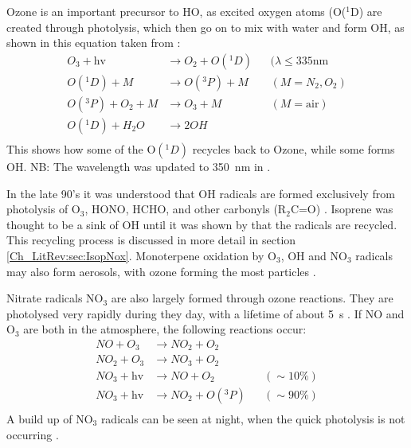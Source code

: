     Ozone is an important precursor to HO, as excited oxygen atoms (O(${}^1$D) are created through photolysis, which then go on to mix with water and form OH, as shown in this equation taken from \citet{Atkinson2000}:
    \begin{align*}
      O_3 + \text{hv}         & \to  O_2 + O({}^1D)   && (\lambda \le 335 \text{nm} \\%
      O({}^1D) + M            & \to  O({}^3P) + M     && (M=N_2, O_2)               \\%
      O({}^3P) + O_2 + M      & \to  O_3 + M          && (M=\text{air})             \\%
      O({}^1D) + H_2O         & \to  2OH              &&                            \\%
    \end{align*}
    This shows how some of the O$({}^1D)$ recycles back to Ozone, while some forms OH.
    NB: The wavelength was updated to 350~nm in \citet{AtkinsonArey2003}.
    
    In the late 90's it was understood that OH radicals are formed exclusively from photolysis of O$_3$, HONO, HCHO, and other carbonyls (R$_2$C=O) \citet{Atkinson2000}.
    Isoprene was thought to be a sink of OH until it was shown by \cite{Paulot2009b} that the radicals are recycled.
    This recycling process is discussed in more detail in section \ref{Ch_LitRev:sec:IsopNox}.
    Monoterpene oxidation by O$_3$, OH and NO$_3$ radicals may also form aerosols, with ozone forming the most particles \citep{Kanakidou2005}.

    Nitrate radicals NO$_3$ are also largely formed through ozone reactions.
    They are photolysed very rapidly during they day, with a lifetime of about 5~s \citep{Atkinson2000}.
    If NO and O$_3$ are both in the atmosphere, the following reactions \citep{Atkinson2000} occur:
    \begin{align*}
      NO + O_3         & \to NO_2 + O_2      && \\%
      NO_2 + O_3       & \to NO_3 + O_2      && \\%
      NO_3 + \text{hv} & \to NO + O_2        && (\sim 10\%) \\%
      NO_3 + \text{hv} & \to NO_2 + O({}^3P) && (\sim 90\%) \\%
    \end{align*}
    A build up of NO$_3$ radicals can be seen at night, when the quick photolysis is not occurring \citep{Atkinson2000,Brown2009}.

